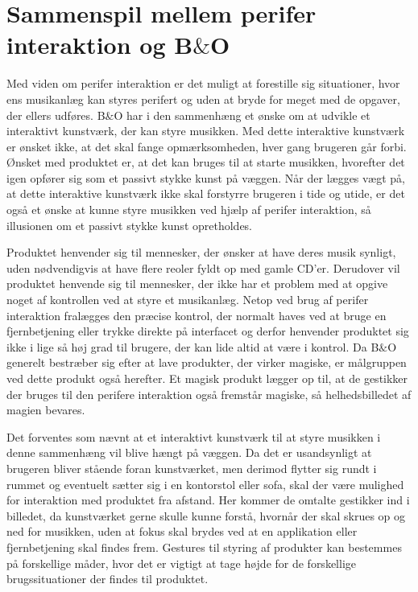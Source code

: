 \section{Sammenspil mellem perifer interaktion og B$\&$O}
\label{Sammenspil mellem perifer interaktion og BO}

Med viden om perifer interaktion er det muligt at forestille sig situationer, hvor ens musikanlæg kan styres perifert og uden at bryde for meget med de opgaver, der ellers udføres. B$\&$O har i den sammenhæng et ønske om at udvikle et interaktivt kunstværk, der kan styre musikken. Med dette interaktive kunstværk er ønsket ikke, at det skal fange opmærksomheden, hver gang brugeren går forbi. Ønsket med produktet er, at det kan bruges til at starte musikken, hvorefter det igen opfører sig som et passivt stykke kunst på væggen. Når der lægges vægt på, at dette interaktive kunstværk ikke skal forstyrre brugeren i tide og utide, er det også et ønske at kunne styre musikken ved hjælp af perifer interaktion, så illusionen om et passivt stykke kunst opretholdes. 

Produktet henvender sig til mennesker, der ønsker at have deres musik synligt, uden nødvendigvis at have flere reoler fyldt op med gamle CD'er. Derudover vil produktet henvende sig til mennesker, der ikke har et problem med at opgive noget af kontrollen ved at styre et musikanlæg. Netop ved brug af perifer interaktion fralægges den præcise kontrol, der normalt haves ved at bruge en fjernbetjening eller trykke direkte på interfacet og derfor henvender produktet sig ikke i lige så høj grad til brugere, der kan lide altid at være i kontrol. Da B$\&$O generelt bestræber sig efter at lave produkter, der virker magiske, er målgruppen ved dette produkt også herefter. Et magisk produkt lægger op til, at de gestikker der bruges til den perifere interaktion også fremstår magiske, så helhedsbilledet af magien bevares. 

Det forventes som nævnt at et interaktivt kunstværk til at styre musikken i denne sammenhæng vil blive hængt på væggen. Da det er usandsynligt at brugeren bliver stående foran kunstværket, men derimod flytter sig rundt i rummet og eventuelt sætter sig i en kontorstol eller sofa, skal der være mulighed for interaktion med produktet fra afstand. Her kommer de omtalte gestikker ind i billedet, da kunstværket gerne skulle kunne forstå, hvornår der skal skrues op og ned for musikken, uden at fokus skal brydes ved at en applikation eller fjernbetjening skal findes frem. Gestures til styring af produkter kan bestemmes på forskellige måder, hvor det er vigtigt at tage højde for de forskellige brugssituationer der findes til produktet.  

